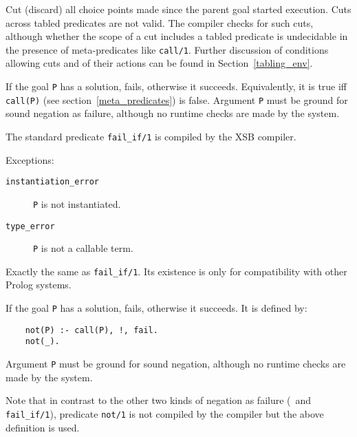 \begin{description}
\ouritem{\cut}\index{{\cut}} 
    Cut (discard) all choice points made since the parent goal
    started execution.
    Cuts across tabled predicates are not valid.  The compiler checks for
    such cuts, although whether the scope of a cut includes a tabled 
    predicate is undecidable in the presence of meta-predicates like
    {\tt call/1}.
    Further discussion of conditions allowing cuts and of their actions 
    can be found in Section~\ref{tabling_env}.

    If the goal {\tt P} has a solution, fails, otherwise it succeeds.
    Equivalently, it is true iff {\tt call(P)} 
    (see section~\ref{meta_predicates}) is false. Argument {\tt P} 
    must be ground for sound negation as failure, although no runtime 
    checks are made by the system.

    The standard predicate {\tt fail\_if/1} is compiled by the 
    XSB compiler.

    Exceptions:
    \begin{description}
    \item[{\tt instantiation\_error}]
	{\tt P} is not instantiated.
    \item[{\tt type\_error}]
	{\tt P} is not a callable term.
    \end{description}


\index{{\tt \not}}
    Exactly the same as {\tt fail\_if/1}.  Its existence is only 
    for compatibility with other Prolog systems.

    If the goal {\tt P} has a solution, fails, otherwise it succeeds.
    It is defined by:
    \begin{center}
    \begin{minipage}{2.40in}
    \begin{verbatim}
	not(P) :- call(P), !, fail.
	not(_).
    \end{verbatim}
    \end{minipage}
    \end{center}

    Argument {\tt P} must be ground for sound negation, although no 
    runtime checks are made by the system.

    Note that in contrast to the other two kinds of negation as failure
    (\not\ and {\tt fail\_if/1}), predicate {\tt not/1} is not compiled
    by the compiler but the above definition is used.


\end{description}
